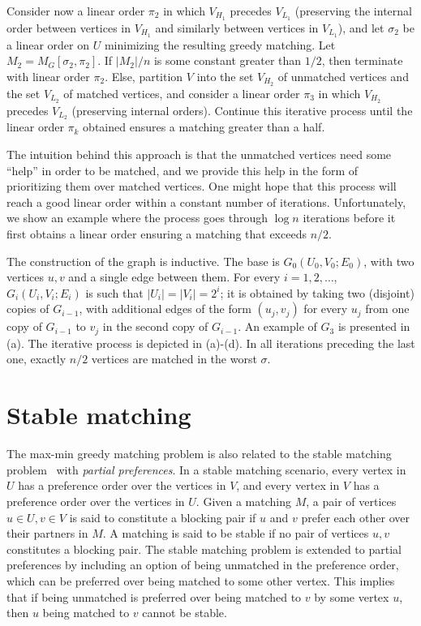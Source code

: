 \documentclass{toc}
\theoremstyle{plain}
\begin{document}
Consider now a linear order $\pi_2$ in which $V_{H_1}$ precedes $V_{L_1}$ (preserving the internal order between vertices in $V_{H_1}$ and similarly between vertices in $V_{L_1}$), and let $\sigma_2$ be a linear order on $U$ minimizing the resulting greedy matching.
Let $M_2=M_G[\sigma_2,\pi_2]$.
If $|M_2|/n$ is some constant greater than $1/2$, then terminate with linear order $\pi_2$.
Else, partition $V$ into the set $V_{H_2}$ of unmatched vertices and the set $V_{L_2}$ of matched vertices, and consider a linear order $\pi_3$ in which $V_{H_2}$ precedes $V_{L_2}$ (preserving internal orders).
Continue this iterative process until the
%
linear order $\pi_k$ obtained  %
ensures a matching greater than a half.

The intuition behind this approach is that the unmatched vertices need some ``help'' in order to be matched, and we provide this help in the form of
prioritizing them over matched vertices. %
%
%
One might hope that this process will reach a good linear order within a constant number of iterations.
Unfortunately, we show an example where the process goes through $\log n$ iterations before it first obtains a linear order ensuring a matching that exceeds $n/2$.

The construction of the graph is inductive.
The base is $G_0(U_0,V_0;E_0)$, with two vertices $u,v$ and a single edge between them.
For every $i=1,2,\ldots$, $G_i(U_i,V_i;E_i)$ is such that $|U_i|=|V_i|=2^i$; it is obtained by taking two (disjoint) copies of $G_{i-1}$, with additional edges of the form $(u_j,v_j)$ for every $u_j$ from one copy of $G_{i-1}$ to $v_j$ in the second copy of $G_{i-1}$.
An example of $G_3$ is presented in (a).
The iterative process is depicted in (a)-(d).
In all iterations preceding the last one, exactly $n/2$ vertices are matched in the worst $\sigma$.

\section{Stable matching}
\label{sec:stable-matching}
The max-min greedy matching problem is also related to the stable matching problem~\cite{GS62} with \emph{partial preferences}.
In a stable matching scenario, every vertex in $U$ has a preference order over %
the vertices in $V$, and every vertex in $V$ has a preference order over %
the vertices in $U$. Given a matching $M$, a pair of vertices $u \in U, v \in V$ is said to constitute a blocking pair if $u$ and $v$ %
prefer each other over their partners in $M$. A matching is said to be stable if no pair of vertices $u,v$ constitutes a blocking pair. The stable matching problem is extended to partial preferences by including an option of being unmatched in the preference order, which can be preferred over being matched to some other vertex. This implies that if %
being  %
unmatched is preferred over being matched to $v$ by some vertex $u$, then $u$ being matched to $v$ cannot be stable.  
%
%
%
%
\end{document}
